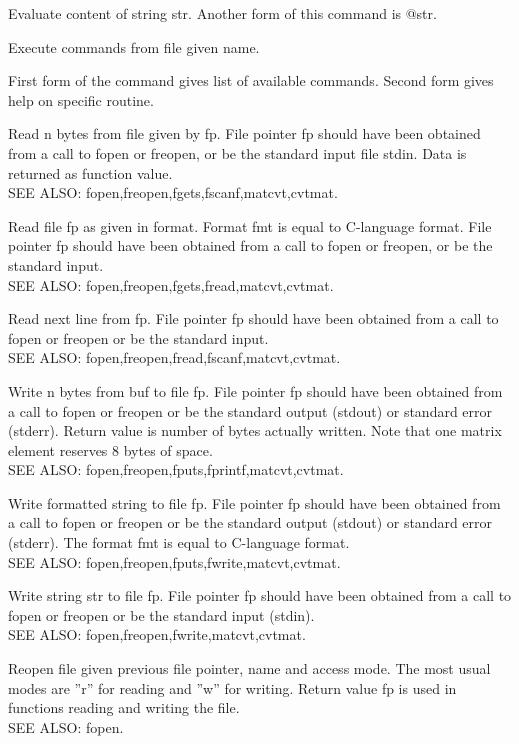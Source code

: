 Evaluate content of string str. Another form of this command is @str. 

Execute commands from file given name. 

First form of the command gives list of available commands. Second form gives help on specific routine. 

Read n bytes from file given by fp. File pointer fp should have been obtained from a call to fopen or freopen, or be the standard input file stdin. Data is returned as function value.  \\
SEE ALSO: fopen,freopen,fgets,fscanf,matcvt,cvtmat. 

Read file fp as given in format. Format fmt is equal to C-language format. File pointer fp should have been obtained from a call to fopen or freopen, or be the standard input. \\
SEE ALSO: fopen,freopen,fgets,fread,matcvt,cvtmat. 

Read next line from fp. File pointer fp should have been obtained from a call to fopen or freopen or be the standard input. \\ 
SEE ALSO: fopen,freopen,fread,fscanf,matcvt,cvtmat. 

Write n bytes from buf to file fp. File pointer fp should have been obtained from a call to fopen or freopen or be the standard output (stdout) or standard error (stderr). Return value is number of bytes actually written. 
Note that one matrix element reserves 8 bytes of space. \\
SEE ALSO: fopen,freopen,fputs,fprintf,matcvt,cvtmat. 

Write formatted string to file fp. File pointer fp should have been obtained from a call to fopen or freopen or be the standard output (stdout) or standard error (stderr). The format fmt is equal to C-language format. \\
SEE ALSO: fopen,freopen,fputs,fwrite,matcvt,cvtmat. 

Write string str to file fp. File pointer fp should have been obtained from a call to fopen or freopen or be the standard input (stdin). \\SEE ALSO: fopen,freopen,fwrite,matcvt,cvtmat. 

Reopen file given previous file pointer, name and access mode. The most usual modes are ''r'' for reading and ''w'' for writing. Return value fp is used in functions reading and writing the file. \\
SEE ALSO: fopen. 

